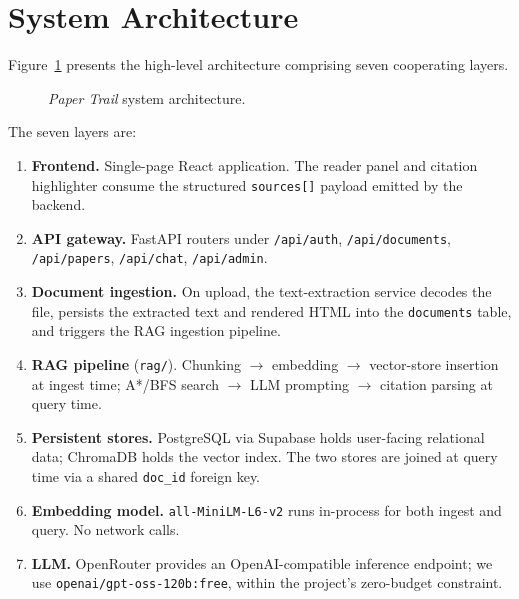 \documentclass[conference]{IEEEtran}
\begin{document}
\section{System Architecture}
\label{sec:architecture}

Figure~\ref{fig:arch} presents the high-level architecture comprising seven
cooperating layers.

\begin{figure}[t]
  \centering
  \caption{\textit{Paper Trail} system architecture.}
  \label{fig:arch}
\end{figure}

The seven layers are:

\begin{enumerate}
  \item \textbf{Frontend.} Single-page React application. The reader panel and
    citation highlighter consume the structured \texttt{sources[]} payload
    emitted by the backend.
  \item \textbf{API gateway.} FastAPI routers under \texttt{/api/auth},
    \texttt{/api/documents}, \texttt{/api/papers}, \texttt{/api/chat},
    \texttt{/api/admin}.
  \item \textbf{Document ingestion.} On upload, the text-extraction service
    decodes the file, persists the extracted text and rendered HTML into the
    \texttt{documents} table, and triggers the RAG ingestion pipeline.
  \item \textbf{RAG pipeline} (\texttt{rag/}). Chunking $\to$ embedding $\to$
    vector-store insertion at ingest time; A*/BFS search $\to$ LLM prompting
    $\to$ citation parsing at query time.
  \item \textbf{Persistent stores.} PostgreSQL via Supabase holds user-facing
    relational data; ChromaDB holds the vector index. The two stores are joined
    at query time via a shared \texttt{doc\_id} foreign key.
  \item \textbf{Embedding model.} \texttt{all-MiniLM-L6-v2} runs in-process
    for both ingest and query. No network calls.
  \item \textbf{LLM.} OpenRouter provides an OpenAI-compatible inference
    endpoint; we use \texttt{openai/gpt-oss-120b:free}, within the project's
    zero-budget constraint.
\end{enumerate}
\end{document}
